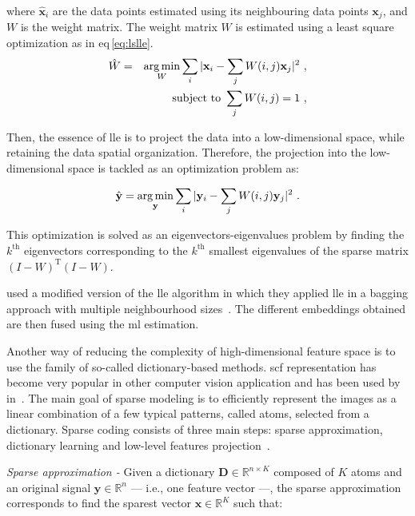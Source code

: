 \noindent where $\hat{\mathbf{x}}_i$ are the data points estimated using its neighbouring data points $\mathbf{x}_j$, and $W$ is the weight matrix.
The weight matrix $W$ is estimated using a least square optimization as in \acs{eq}\,\eqref{eq:lslle}.
\begin{eqnarray}
	\hat{W} & = & \operatorname*{arg\,min}_{W} \sum_i | \mathbf{x}_i - \sum_j W(i,j)\mathbf{x}_j |^{2} \ , \label{eq:lslle} \\
	&& \text{subject to } \sum_j W(i,j) = 1 \ , \nonumber
\end{eqnarray}

Then, the essence of \ac{lle} is to project the data into a low-dimensional space, while retaining the data spatial organization.
Therefore, the projection into the low-dimensional space is tackled as an optimization problem as:

\begin{equation}
	\hat{\mathbf{y}} = \operatorname*{arg\,min}_{\mathbf{y}} \sum_i | \mathbf{y}_i - \sum_j W(i,j)\mathbf{y}_j |^{2} \ .
	\label{eq:lowprojlle}
\end{equation}

This optimization is solved as an eigenvectors-eigenvalues problem by finding the $k^{\text{th}}$ eigenvectors corresponding to the $k^{\text{th}}$ smallest eigenvalues of the sparse matrix $(I-W)^{\text{T}}(I-W)$.

\citeauthor{Tiwari2008} used a modified version of the \ac{lle} algorithm in which they applied \ac{lle} in a bagging approach with multiple neighbourhood sizes~\cite{Tiwari2008}.
The different embeddings obtained are then fused using the \ac{ml} estimation.

Another way of reducing the complexity of high-dimensional feature space is to use the family of so-called dictionary-based methods.
\Ac{scf} representation has become very popular in other computer vision application and has been used by \citeauthor{lehaire2014computer} in~\cite{lehaire2014computer}.
The main goal of sparse modeling is to efficiently represent the images as a linear combination of a few typical patterns, called atoms, selected from a dictionary.
Sparse coding consists of three main steps: sparse approximation, dictionary learning and low-level features projection~\cite{rubinstein2008efficient}.

\emph{Sparse approximation -} Given a dictionary $\mathbf{D} \in \mathbb{R}^{n \times K}$ composed of $K$ atoms and an original signal $\mathbf{y} \in \mathbb{R}^{n}$ --- i.e., one feature vector ---, the sparse approximation corresponds to find the sparest vector $\mathbf{x} \in \mathbb{R}^{K}$ such that:

